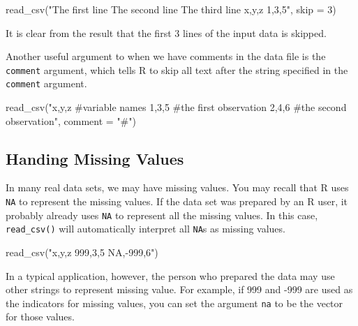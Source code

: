 \documentclass[
]{book}
\newenvironment{Shaded}{\begin{snugshade}}{\end{snugshade}}
\newcommand{\AttributeTok}[1]{\textcolor[rgb]{0.77,0.63,0.00}{#1}}
\newcommand{\DecValTok}[1]{\textcolor[rgb]{0.00,0.00,0.81}{#1}}
\newcommand{\FunctionTok}[1]{\textcolor[rgb]{0.00,0.00,0.00}{#1}}
\newcommand{\NormalTok}[1]{#1}
\newcommand{\StringTok}[1]{\textcolor[rgb]{0.31,0.60,0.02}{#1}}
\begin{document}
\begin{Shaded}
\begin{Highlighting}[]
\FunctionTok{read\_csv}\NormalTok{(}\StringTok{"The first line }
\StringTok{          The second line}
\StringTok{          The third line}
\StringTok{          x,y,z}
\StringTok{          1,3,5"}\NormalTok{, }\AttributeTok{skip =} \DecValTok{3}\NormalTok{)}
\end{Highlighting}
\end{Shaded}

It is clear from the result that the first 3 lines of the input data is skipped.

Another useful argument to when we have comments in the data file is the \texttt{comment} argument, which tells R to skip all text after the string specified in the \texttt{comment} argument.

\begin{Shaded}
\begin{Highlighting}[]
\FunctionTok{read\_csv}\NormalTok{(}\StringTok{"x,y,z \#variable names}
\StringTok{         1,3,5 \#the first observation}
\StringTok{         2,4,6 \#the second observation"}\NormalTok{, }\AttributeTok{comment =} \StringTok{"\#"}\NormalTok{)}
\end{Highlighting}
\end{Shaded}

\hypertarget{handing-missing-values}{%
\subsection{Handing Missing Values}\label{handing-missing-values}}

In many real data sets, we may have missing values. You may recall that R uses \texttt{NA} to represent the missing values. If the data set was prepared by an R user, it probably already uses \texttt{NA} to represent all the missing values. In this case, \texttt{read\_csv()} will automatically interpret all \texttt{NA}s as missing values.

\begin{Shaded}
\begin{Highlighting}[]
\FunctionTok{read\_csv}\NormalTok{(}\StringTok{"x,y,z}
\StringTok{          999,3,5}
\StringTok{         NA,{-}999,6"}\NormalTok{)}
\end{Highlighting}
\end{Shaded}

In a typical application, however, the person who prepared the data may use other strings to represent missing value. For example, if 999 and -999 are used as the indicators for missing values, you can set the argument \texttt{na} to be the vector for those values.
\end{document}
